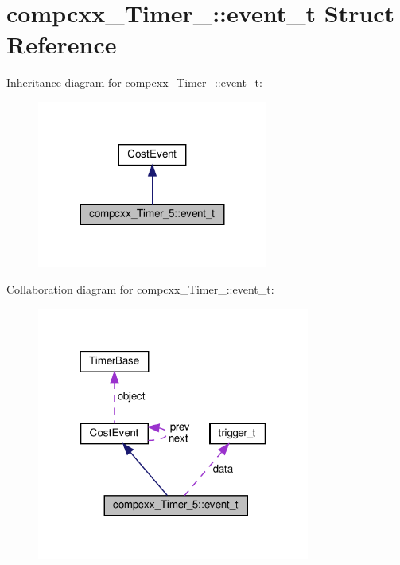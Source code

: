 \hypertarget{structcompcxx__Timer__5_1_1event__t}{}\section{compcxx\+\_\+\+Timer\+\_\+:\+:event\+\_\+t Struct Reference}
\label{structcompcxx__Timer__5_1_1event__t}


Inheritance diagram for compcxx\+\_\+\+Timer\+\_\+:\+:event\+\_\+t\+:\nopagebreak
\begin{figure}[H]
\begin{center}
\leavevmode
\includegraphics[width=215pt]{structcompcxx__Timer__5_1_1event__t__inherit__graph}
\end{center}
\end{figure}


Collaboration diagram for compcxx\+\_\+\+Timer\+\_\+:\+:event\+\_\+t\+:\nopagebreak
\begin{figure}[H]
\begin{center}
\leavevmode
\includegraphics[width=254pt]{structcompcxx__Timer__5_1_1event__t__coll__graph}
\end{center}
\end{figure}
